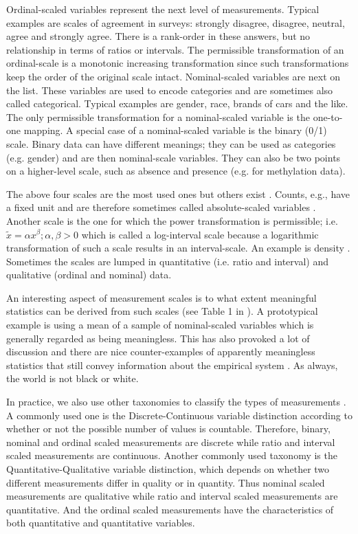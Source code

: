 Ordinal-scaled variables represent the next level of measurements. Typical examples are scales of agreement in surveys: strongly disagree, disagree, neutral, agree and strongly agree. There is a rank-order in these answers, but no relationship in terms of ratios or intervals. The permissible transformation of an ordinal-scale is a monotonic increasing transformation since such transformations keep the order of the original scale intact. Nominal-scaled variables are next on the list. These variables are used to encode categories and are sometimes also called categorical. Typical examples are gender, race, brands of cars and the like. The only permissible transformation for a nominal-scaled variable is the one-to-one mapping. A special case of a nominal-scaled variable is the binary (0/1) scale. Binary data can have different meanings; they can be used as categories (e.g. gender) and are then nominal-scale variables. They can also be two points on a higher-level scale, such as absence and presence (e.g. for methylation data).

The above four scales are the most used ones but others exist \cite{Suppes1962,Krantz1971}. Counts, e.g., have a fixed unit and are therefore sometimes called absolute-scaled variables \cite{Narens1986}. Another scale is the one for which the power transformation is permissible; i.e. $\widetilde{x}=\alpha x^\beta; \alpha, \beta>0$ which is called a log-interval scale because a logarithmic transformation of such a scale results in an interval-scale. An example is density \cite{Krantz1971}. Sometimes the scales are lumped in quantitative (i.e. ratio and interval) and qualitative (ordinal and nominal) data.

An interesting aspect of measurement scales is to what extent meaningful statistics can be derived from such scales (see Table 1 in \cite{Stevens1946}). A prototypical example is using a mean of a sample of nominal-scaled variables which is generally regarded as being meaningless. This has also provoked a lot of discussion \cite{Adams1965,Hand1996} and there are nice counter-examples of apparently meaningless statistics that still convey information about the empirical system \cite{Michell1986}. As always, the world is not black or white.

In practice, we also use other taxonomies to classify the types of measurements \cite{agresti2013categorical}. A commonly used one is the Discrete-Continuous variable distinction according to whether or not the possible number of values is countable. Therefore, binary, nominal and ordinal scaled measurements are discrete while ratio and interval scaled measurements are continuous. Another commonly used taxonomy is the Quantitative-Qualitative variable distinction, which depends on whether two different measurements differ in quality or in quantity. Thus nominal scaled measurements are qualitative while ratio and interval scaled measurements are quantitative. And the ordinal scaled measurements have the characteristics of both quantitative and quantitative variables.

